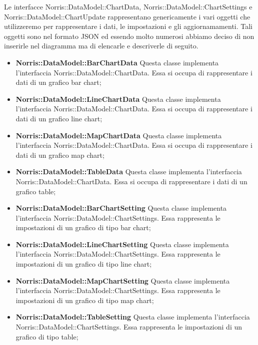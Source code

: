 	Le interfacce Norris::DataModel::ChartData, Norris::DataModel::ChartSettings e Norris::DataModel::ChartUpdate rappresentano genericamente i vari oggetti che utilizzeremo per rappresentare i dati, le impostazioni e gli aggiornamamenti. Tali oggetti sono nel formato JSON ed essendo molto numerosi abbiamo deciso di non inserirle nel diagramma ma di elencarle e descriverle di seguito.

	\begin{itemize}
		\item \textbf{Norris::DataModel::BarChartData} Questa classe implementa l'interfaccia Norris::DataModel::ChartData. Essa si occupa di rappresentare i dati di un grafico bar chart;

		\item \textbf{Norris::DataModel::LineChartData} Questa classe implementa l'interfaccia Norris::DataModel::ChartData. Essa si occupa di rappresentare i dati di un grafico line chart;

		\item \textbf{Norris::DataModel::MapChartData} Questa classe implementa l'interfaccia Norris::DataModel::ChartData. Essa si occupa di rappresentare i dati di un grafico map chart;

		\item \textbf{Norris::DataModel::TableData} Questa classe implementa l'interfaccia \linebreak Norris::DataModel::ChartData. Essa si occupa di rappresentare i dati di un grafico table;

		\item \textbf{Norris::DataModel::BarChartSetting} Questa classe implementa l'interfaccia Norris::DataModel::ChartSettings. Essa rappresenta le impostazioni di un grafico di tipo bar chart;

		\item \textbf{Norris::DataModel::LineChartSetting} Questa classe implementa l'interfaccia Norris::DataModel::ChartSettings. Essa rappresenta le impostazioni di un grafico di tipo line chart;

		\item \textbf{Norris::DataModel::MapChartSetting} Questa classe implementa l'interfaccia Norris::DataModel::ChartSettings. Essa rappresenta le impostazioni di un grafico di tipo map chart;

		\item \textbf{Norris::DataModel::TableSetting} Questa classe implementa l'interfaccia Norris::DataModel::ChartSettings. Essa rappresenta le impostazioni di un grafico di tipo table;


\end{itemize}
